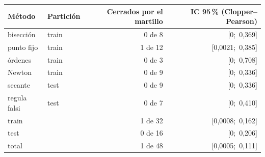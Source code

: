 \begin{tabular}{@{}llrr@{}}
\toprule
Método & Partición & Cerrados por el martillo & IC 95\,\% (Clopper--Pearson)\\
\midrule
bisección & train & 0 de 8 & [0;\ 0{,}369] \\
punto fijo & train & 1 de 12 & [0{,}0021;\ 0{,}385] \\
órdenes & train & 0 de 3 & [0;\ 0{,}708] \\
Newton & train & 0 de 9 & [0;\ 0{,}336] \\
secante & test & 0 de 9 & [0;\ 0{,}336] \\
regula falsi & test & 0 de 7 & [0;\ 0{,}410] \\
\midrule
train & & 1 de 32 & [0{,}0008;\ 0{,}162]\\
test & & 0 de 16 & [0;\ 0{,}206]\\
total & & 1 de 48 & [0{,}0005;\ 0{,}111]\\
\bottomrule
\end{tabular}
